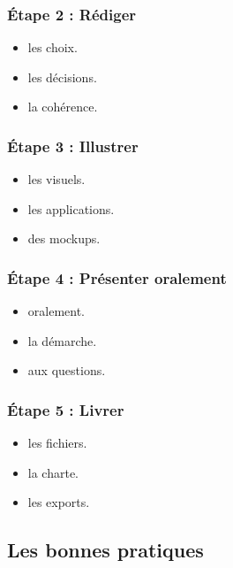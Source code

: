 \subsubsection{Étape 2 : Rédiger}

\begin{itemize}
    \item {} les choix.
    \item {} les décisions.
    \item {} la cohérence.
\end{itemize}

\subsubsection{Étape 3 : Illustrer}

\begin{itemize}
    \item {} les visuels.
    \item {} les applications.
    \item {} des mockups.
\end{itemize}

\subsubsection{Étape 4 : Présenter oralement}

\begin{itemize}
    \item {} oralement.
    \item {} la démarche.
    \item {} aux questions.
\end{itemize}

\subsubsection{Étape 5 : Livrer}

\begin{itemize}
    \item {} les fichiers.
    \item {} la charte.
    \item {} les exports.
\end{itemize}

\subsection{Les bonnes pratiques}

